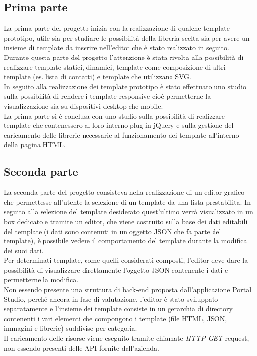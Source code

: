\subsection{Prima parte}
La prima parte del progetto inizia con la realizzazione di qualche template prototipo, utile sia per studiare le possibilità della libreria scelta sia per avere un insieme di template da inserire nell'editor che è stato realizzato in seguito.\\
Durante questa parte del progetto l'attenzione è stata rivolta alla possibilità di realizzare template statici, dinamici, template come composizione di altri template (es. lista di contatti) e template che utilizzano SVG.\\
In seguito alla realizzazione dei template prototipo è stato effettuato uno studio sulla possibilità di rendere i template responsive cioè permetterne la visualizzazione sia su dispositivi desktop che mobile.\\
La prima parte si è conclusa con uno studio sulla possibilità di realizzare template che contenessero al loro interno plug-in jQuery e sulla gestione del caricamento delle librerie necessarie al funzionamento dei template all'interno della pagina HTML.

\subsection{Seconda parte}
La seconda parte del progetto consisteva nella realizzazione di un editor grafico che permettesse all'utente la selezione di un template da una lista prestabilita.
In seguito alla selezione del template desiderato quest'ultimo verrà visualizzato in un box dedicato e tramite un editor, che viene costruito sulla base dei dati editabili del template (i dati sono contenuti in un oggetto JSON che fa parte del template), è possibile vedere il comportamento del template durante la modifica dei suoi dati.	\\
Per determinati template, come quelli considerati composti, l'editor deve dare la possibilità di visualizzare direttamente l'oggetto JSON contenente i dati e permetterne la modifica.\\
Non essendo presente una struttura di back-end proposta dall'applicazione Portal Studio, perché ancora in fase di valutazione, l'editor è stato sviluppato separatamente e l'insieme dei template consiste in un gerarchia di directory contenenti i vari elementi che compongono i template (file HTML, JSON, immagini e librerie) suddivise per categoria.\\
Il caricamento delle risorse viene eseguito tramite chiamate \textit{HTTP GET} request, non essendo presenti delle API fornite dall'azienda.


